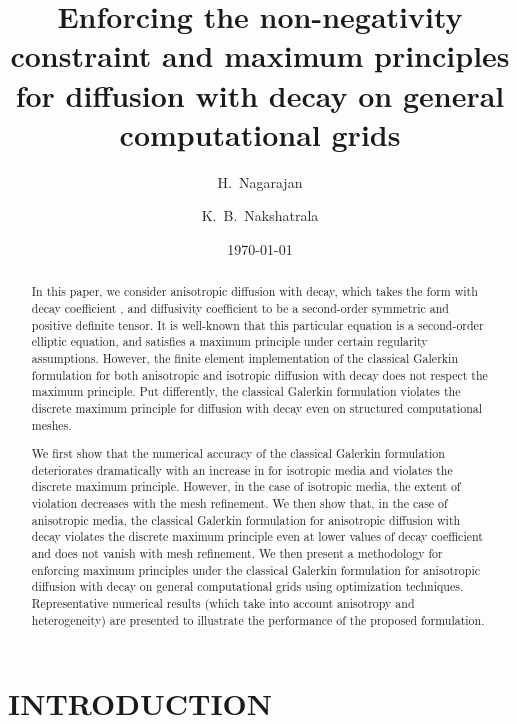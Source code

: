 \documentclass[11pt]{amsart}
\title{Enforcing the non-negativity constraint and maximum principles 
for diffusion with decay on general computational grids}
\author{H.~Nagarajan} \author{K.~B.~Nakshatrala}
\date{\today}
\begin{document}
\begin{abstract}
  In this paper, we consider anisotropic diffusion with decay, which takes the form  with 
  decay coefficient , and diffusivity coefficient  to 
  be a second-order symmetric and positive definite tensor. It is well-known that this particular equation 
  is a second-order elliptic equation, and satisfies a maximum principle under certain regularity 
  assumptions. However, the finite element implementation of the classical Galerkin formulation for 
  both anisotropic and isotropic diffusion with decay does not respect the maximum principle. Put 
  differently, the classical Galerkin formulation violates the discrete maximum principle for diffusion 
  with decay even on structured computational meshes. 
  
  We first show that the numerical accuracy of the classical Galerkin formulation deteriorates 
  dramatically with an increase in  for isotropic media and violates the discrete maximum 
  principle. However, in the case of isotropic media, the extent of violation decreases with the mesh 
  refinement. We then show that, in the case of anisotropic media, the classical Galerkin formulation 
  for anisotropic diffusion with decay violates the discrete maximum principle even at lower values of 
  decay coefficient and does not vanish with mesh refinement. We then present a methodology for 
  enforcing maximum principles under the classical Galerkin formulation for anisotropic diffusion 
  with decay on general computational grids using optimization techniques. Representative 
  numerical results (which take into account anisotropy and heterogeneity) are presented to 
  illustrate the performance of the proposed formulation. 
\end{abstract}

\maketitle 



\section{INTRODUCTION}
\label{Sec:Decay_Introduction}
\end{document}
